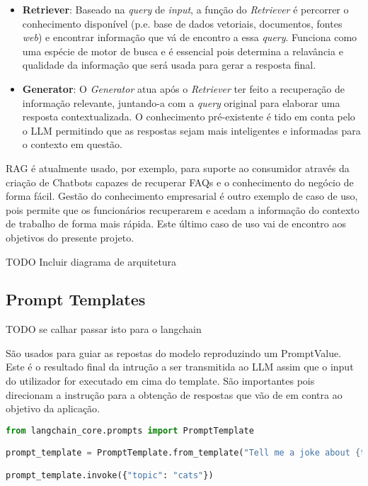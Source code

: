 \begin{itemize}
    \item \textbf{Retriever}: Baseado na \textit{query} de \textit{input}, a função do \textit{Retriever} é percorrer o conhecimento disponível (p.e. base de dados vetoriais, documentos, fontes \textit{web}) e encontrar informação que vá de encontro a essa \textit{query}. Funciona como uma espécie de motor de busca e é essencial pois determina a relavância e qualidade da informação que será usada para gerar a resposta final. 
    \item \textbf{Generator}: O \textit{Generator} atua após o \textit{Retriever} ter feito a recuperação de informação relevante, juntando-a com a \textit{query} original para elaborar uma resposta contextualizada. O conhecimento pré-existente é tido em conta pelo o LLM permitindo que as respostas sejam mais inteligentes e informadas para o contexto em questão. 
\end{itemize}


RAG é atualmente usado, por exemplo, para suporte ao consumidor através da criação de Chatbots capazes de recuperar FAQs e o conhecimento do negócio de forma fácil. Gestão do conhecimento empresarial é outro exemplo de caso de uso, pois permite que os funcionários recuperarem e acedam a informação do contexto de trabalho de forma mais rápida. Este último caso de uso vai de encontro aos objetivos do presente projeto. 

TODO Incluir diagrama de arquitetura



\subsection{Prompt Templates} TODO se calhar passar isto para o langchain

São usados para guiar as repostas do modelo reproduzindo um PromptValue. Este é o resultado final da intrução a ser transmitida ao LLM assim que o input do utilizador for executado em cima do template. São importantes pois direcionam a instrução para a obtenção de respostas que vão de em contra ao objetivo da aplicação. 


\begin{lstlisting}[language=Python, caption={Using LangChain to create a prompt template}, label={lst:joke-prompt}]
from langchain_core.prompts import PromptTemplate

prompt_template = PromptTemplate.from_template("Tell me a joke about {topic}")

prompt_template.invoke({"topic": "cats"})
\end{lstlisting}

